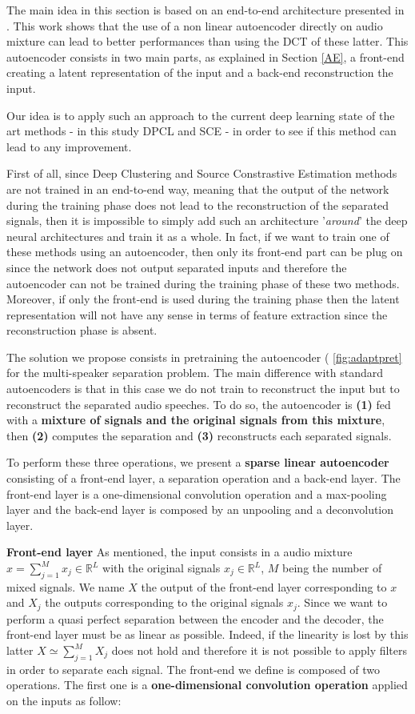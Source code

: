 \documentclass[master, tikz, final,11pt, dvipdfmx]{iscs-thesis}
\begin{document}
The main idea in this section is based on an end-to-end architecture presented in \cite{Adaptive}. This work shows that the use of a non linear autoencoder directly on audio mixture can lead to better performances than using the DCT of these latter. This autoencoder consists in two main parts, as explained in Section \ref{AE}, a front-end creating a latent representation of the input and a back-end reconstruction the input.

Our idea is to apply such an approach to the current deep learning state of the art methods - in this study DPCL and SCE - in order to see if this method can lead to any improvement.
 
First of all, since Deep Clustering and Source Constrastive Estimation methods are not trained in an end-to-end way, meaning that the output of the network during the training phase does not lead to the reconstruction of the separated signals, then it is impossible to simply add such an architecture '\textit{around}' the deep neural architectures and train it as a whole. In fact, if we want to train one of these methods using an autoencoder, then only its front-end part can be plug on since the network does not output separated inputs and therefore the autoencoder can not be trained during the training phase of these two methods. Moreover, if only the front-end is used during the training phase then the latent representation will not have any sense in terms of feature extraction since the reconstruction phase is absent. 

The solution we propose consists in pretraining the autoencoder ( \autoref{fig:adaptpret} for the multi-speaker separation problem. The main difference with standard autoencoders is that in this case we do not train to reconstruct the input but to reconstruct the separated audio speeches. To do so, the autoencoder is \textbf{(1)} fed with a \textbf{mixture of signals and the original signals from this mixture}, then \textbf{(2)} computes the separation and \textbf{(3)} reconstructs each separated signals.

To perform these three operations, we present a \textbf{sparse linear autoencoder} consisting of a front-end layer, a separation operation and a back-end layer. The front-end layer is a one-dimensional convolution operation and a max-pooling layer and the back-end layer is composed by an unpooling and a deconvolution layer.

\textbf{Front-end layer}
As mentioned, the input consists in a audio mixture $x = \sum_{j=1}^{M}{x_j} \in \mathbb{R}^L$ with the original signals $x_j \in \mathbb{R}^L$, $M$ being the number of mixed signals. We name $X$ the output of the front-end layer corresponding to $x$ and $X_j$ the outputs corresponding to the original signals $x_j$. Since we want to perform a quasi perfect separation between the encoder and the decoder, the front-end layer must be as linear as possible. Indeed, if the linearity is lost by this latter $X \simeq \sum_{j=1}^{M}{X_j}$ does not hold and therefore it is not possible to apply filters in order to separate each signal.
The front-end we define is composed of two operations. The first one is a \textbf{one-dimensional convolution operation} applied on the inputs as follow:
\end{document}
